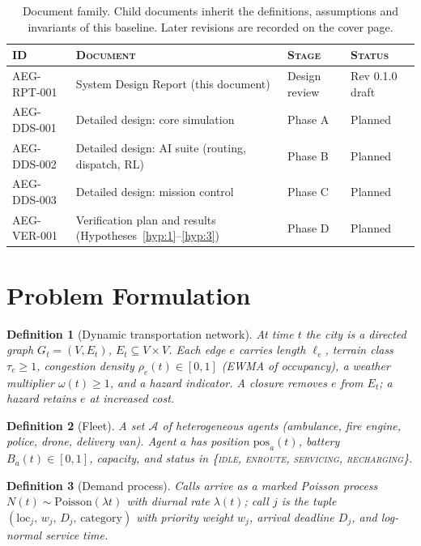 \documentclass[11pt,a4paper]{article}
\theoremstyle{spaceddef}
\newtheorem{definition}{Definition}[section]
\theoremstyle{spacedplain}
\begin{document}
\begin{table}[H]\centering\small
\begin{tabular}{@{}llll@{}}
\toprule
\textsc{ID} & \textsc{Document} & \textsc{Stage} & \textsc{Status} \\
\midrule
AEG-RPT-001 & System Design Report (this document) & Design review & Rev 0.1.0 draft \\
AEG-DDS-001 & Detailed design: core simulation & Phase A & Planned \\
AEG-DDS-002 & Detailed design: AI suite (routing, dispatch, RL) & Phase B & Planned \\
AEG-DDS-003 & Detailed design: mission control & Phase C & Planned \\
AEG-VER-001 & Verification plan and results (Hypotheses~\ref{hyp:1}--\ref{hyp:3}) & Phase D & Planned \\
\bottomrule
\end{tabular}
\caption{Document family. Child documents inherit the definitions, assumptions
and invariants of this baseline. Later revisions are recorded on the cover page.}
\end{table}

\section{Problem Formulation}\label{sec:problem}

\begin{definition}[Dynamic transportation network]\label{def:network}
At time $t$ the city is a directed graph $G_t=(V,E_t)$, $E_t\subseteq V\times V$.
Each edge $e$ carries length $\ell_e$, terrain class $\tau_e\ge1$, congestion
density $\rho_e(t)\in[0,1]$ (EWMA of occupancy), a weather multiplier $\omega(t)\ge1$,
and a hazard indicator. A \emph{closure} removes $e$ from $E_t$; a \emph{hazard}
retains $e$ at increased cost.
\end{definition}

\begin{definition}[Fleet]
A set $\mathcal{A}$ of heterogeneous agents (ambulance, fire engine, police, drone,
delivery van). Agent $a$ has position $\mathrm{pos}_a(t)$, battery $B_a(t)\in[0,1]$,
capacity, and status in \{\textsc{idle}, \textsc{enroute}, \textsc{servicing},
\textsc{recharging}\}.
\end{definition}

\begin{definition}[Demand process]
Calls arrive as a marked Poisson process $N(t)\sim\mathrm{Poisson}(\lambda t)$ with
diurnal rate $\lambda(t)$; call $j$ is the tuple $(\mathrm{loc}_j,\,w_j,\,D_j,\,
\text{category})$ with priority weight $w_j$, arrival deadline $D_j$, and
log-normal service time.
\end{definition}
\end{document}

